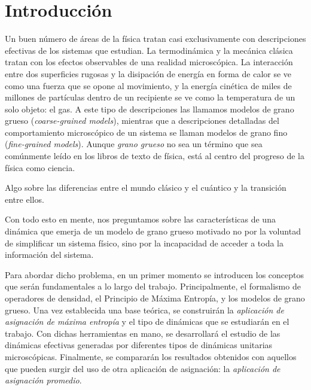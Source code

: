 \chapter*{Introducción}



Un buen número de áreas de la física tratan casi exclusivamente con descripciones efectivas de los sistemas que estudian. La termodinámica y la mecánica clásica tratan con los efectos observables de una realidad microscópica. La interacción entre dos superficies rugosas y la disipación de energía en forma de calor se ve como una fuerza que se opone al movimiento, y la energía cinética de miles de millones de partículas dentro de un recipiente se ve como la temperatura de un solo objeto: el gas. A este tipo de descripciones las llamamos modelos de grano grueso (\textit{coarse-grained models}), mientras que a descripciones detalladas del comportamiento microscópico de un sistema se llaman modelos de grano fino (\textit{fine-grained models}). Aunque \textit{grano grueso} no sea un término que sea comúnmente leído en los libros de texto de física, está al centro del progreso de la física como ciencia. 



Algo sobre las diferencias entre el mundo clásico y el cuántico y la transición entre ellos.


Con todo esto en mente, nos preguntamos sobre las características de una dinámica que emerja de un modelo de grano grueso motivado no por la voluntad de simplificar un sistema físico, sino por la incapacidad de acceder a toda la información del sistema.


Para abordar dicho problema, en un primer momento se introducen los conceptos que serán fundamentales a lo largo del trabajo. Principalmente, el formalismo de operadores de densidad, el Principio de Máxima Entropía, y los modelos de grano grueso. Una vez establecida una base teórica, se construirán la \textit{aplicación de asignación de máxima entropía} y el tipo de dinámicas que se estudiarán en el trabajo. Con dichas herramientas en mano, se desarrollará el estudio de las dinámicas efectivas generadas por diferentes tipos de dinámicas unitarias microscópicas. Finalmente, se compararán los resultados obtenidos con aquellos que pueden surgir del uso de otra aplicación de asignación: la \textit{aplicación de asignación promedio}.